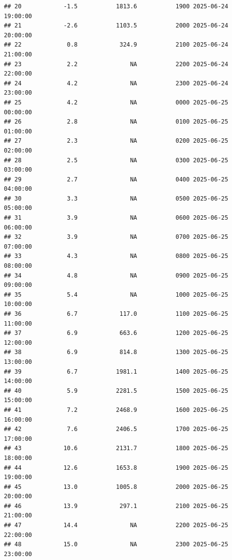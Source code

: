 \documentclass[
]{article}
\begin{document}
\begin{verbatim}
## 20            -1.5           1813.6           1900 2025-06-24 19:00:00
## 21            -2.6           1103.5           2000 2025-06-24 20:00:00
## 22             0.8            324.9           2100 2025-06-24 21:00:00
## 23             2.2               NA           2200 2025-06-24 22:00:00
## 24             4.2               NA           2300 2025-06-24 23:00:00
## 25             4.2               NA           0000 2025-06-25 00:00:00
## 26             2.8               NA           0100 2025-06-25 01:00:00
## 27             2.3               NA           0200 2025-06-25 02:00:00
## 28             2.5               NA           0300 2025-06-25 03:00:00
## 29             2.7               NA           0400 2025-06-25 04:00:00
## 30             3.3               NA           0500 2025-06-25 05:00:00
## 31             3.9               NA           0600 2025-06-25 06:00:00
## 32             3.9               NA           0700 2025-06-25 07:00:00
## 33             4.3               NA           0800 2025-06-25 08:00:00
## 34             4.8               NA           0900 2025-06-25 09:00:00
## 35             5.4               NA           1000 2025-06-25 10:00:00
## 36             6.7            117.0           1100 2025-06-25 11:00:00
## 37             6.9            663.6           1200 2025-06-25 12:00:00
## 38             6.9            814.8           1300 2025-06-25 13:00:00
## 39             6.7           1981.1           1400 2025-06-25 14:00:00
## 40             5.9           2281.5           1500 2025-06-25 15:00:00
## 41             7.2           2468.9           1600 2025-06-25 16:00:00
## 42             7.6           2406.5           1700 2025-06-25 17:00:00
## 43            10.6           2131.7           1800 2025-06-25 18:00:00
## 44            12.6           1653.8           1900 2025-06-25 19:00:00
## 45            13.0           1005.8           2000 2025-06-25 20:00:00
## 46            13.9            297.1           2100 2025-06-25 21:00:00
## 47            14.4               NA           2200 2025-06-25 22:00:00
## 48            15.0               NA           2300 2025-06-25 23:00:00
\end{verbatim}
\end{document}

